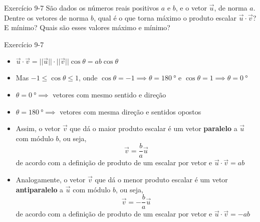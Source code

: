 \begin{frame}[c]{Exercício 9-7}
    São dados os números reais positivos \(a\) e \(b\), e o vetor \(\vec{u}\), de norma \(a\).
    Dentre os vetores de norma \(b\), qual é o que torna máximo o produto escalar \(\vec{u}\cdot\vec{v}\)?
    E mínimo? Quais são esses valores máximo e mínimo?
\end{frame}

\begin{frame}{Exercício 9-7}
    \begin{itemize}
        \item \(
            \vec{u}\cdot\vec{v}=||\vec{u}||\cdot ||\vec{v}||\cos{\theta}=
            ab\cos{\theta}
            \)
        \item Mas \(-1 \leq \cos{\theta} \leq 1\), onde \(
            \cos{\theta}=-1 \implies\theta=\SI{180}{\degree}\) e \(
            \cos{\theta}=1 \implies\theta=\SI{0}{\degree}\)
        \item \(\theta=\SI{0}{\degree} \implies \) vetores com mesmo sentido e direção
        \item \(\theta=\SI{180}{\degree} \implies \) vetores com mesma direção e sentidos opostos
        \item Assim, o vetor \(\vec{v}\) que dá o maior produto escalar é um vetor \textbf{paralelo} a \(\vec{u}\) com módulo \(b\), ou seja,
            \[
                \vec{v}=\frac{b}{a}\vec{u}
            \]
            de acordo com a definição de produto de um escalar por vetor e \(
            \vec{u}\cdot\vec{v}=ab\)

        \item Analogamente, o vetor \(\vec{v}\) que dá o menor produto escalar é um vetor \textbf{antiparalelo} a \(\vec{u}\) com módulo \(b\), ou seja,
            \[
                \vec{v}=-\frac{b}{a}\vec{u}
            \]
            de acordo com a definição de produto de um escalar por vetor e \(
            \vec{u}\cdot\vec{v}=-ab\)
    \end{itemize}

\end{frame}

